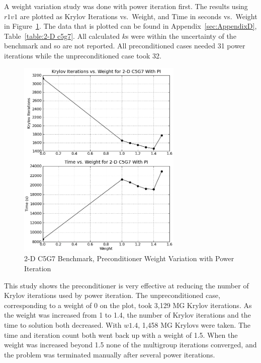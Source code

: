 A weight variation study was done with power iteration first. The results using $r1v1$ are plotted as Krylov Iterations vs.\ Weight, and Time in seconds vs.\ Weight in Figure~\ref{fig:2-Dc5g7PI}. The data that is plotted can be found in Appendix~\ref{sec:AppendixD}, Table~\ref{table:2-D c5g7}. All calculated $k$s were within the uncertainty of the benchmark and so are not reported. All preconditioned cases needed 31 power iterations while the unpreconditioned case took 32.
%
\begin{figure}[!ht]
    \begin{center}
      \includegraphics [width=0.7\textwidth, height=0.7\textheight] {2dc5g7PI}
   \end{center}
   \caption{2-D C5G7 Benchmark, Preconditioner Weight Variation with Power Iteration}
   \label{fig:2-Dc5g7PI}
\end{figure}

This study shows the preconditioner is very effective at reducing the number of Krylov iterations used by power iteration. The unpreconditioned case, corresponding to a weight of 0 on the plot, took 3,129 MG Krylov iterations. As the weight was increased from 1 to 1.4, the number of Krylov iterations and the time to solution both decreased. With $w1.4$, 1,458 MG Krylovs were taken. The time and iteration count both went back up with a weight of 1.5. When the weight was increased beyond 1.5 none of the multigroup iterations converged, and the problem was terminated manually after several power iterations. 

